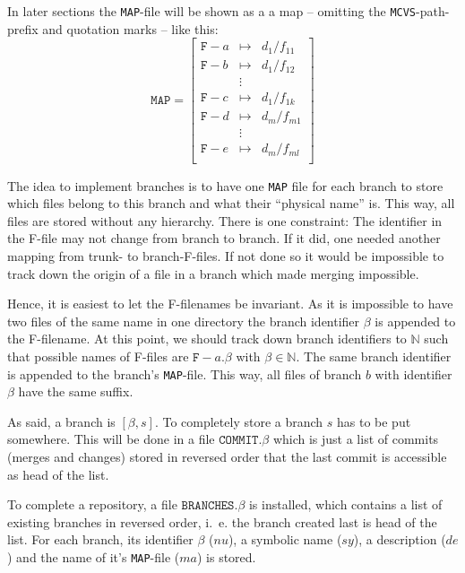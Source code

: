 \documentclass[fleqn, 10pt, a4paper]{article}
\begin{document}
In later sections the \texttt{MAP}-file will be shown as a
a map -- omitting the \texttt{MCVS}-path-prefix and quotation
marks -- like this:
\begin{displaymath}
\mathtt{MAP} =\left[
\begin{array}{lcl}
\mathtt{F-}a &\mapsto& d_1/f_{11} \\
\mathtt{F-}b &\mapsto& d_1/f_{12} \\
             &\vdots & \\
\mathtt{F-}c &\mapsto& d_1/f_{1k} \\
\mathtt{F-}d &\mapsto& d_m/f_{m1} \\
             &\vdots & \\
\mathtt{F-}e &\mapsto& d_m/f_{ml} \\
\end{array}\right]
\end{displaymath}

The idea to implement branches is to have one \texttt{MAP} file
for each branch to store which files belong to this branch and what
their ``physical name'' is. This way, all files are stored without
any hierarchy. There is one constraint: The identifier in the
F-file may not change from branch to branch. If it did, one
needed another mapping from trunk- to branch-F-files. If not done
so it would be impossible to track down the origin of a file in
a branch which made merging impossible.

Hence, it is easiest to let the F-filenames be invariant. As it is
impossible to have two files of the same name in one directory the
branch identifier $\beta$ is appended to the F-filename. At this
point, we should track down branch identifiers to $\mathbb{N}$
such that possible names of F-files are $\mathtt{F-}a\mathtt{.}\beta$
with $\beta\in \mathbb{N}$. The same branch identifier is appended
to the branch's \texttt{MAP}-file. This way, all files of
branch $b$ with identifier $\beta$ have the same suffix.

As said, a branch is $[\beta, s]$. To completely store a branch
$s$ has to be put somewhere. This will be done in a file
$\mathtt{COMMIT}.\beta$ which is just a list of commits (merges
and changes) stored in reversed order that the last commit is
accessible as head of the list.

To complete a repository, a file $\mathtt{BRANCHES.}\beta$ is installed,
which contains a list of existing branches in reversed order,
i.~e. the branch created last is head of the list.
For each branch, its identifier $\beta$ ($nu$), a symbolic name
($sy$), a description ($de$) and the name of it's
\texttt{MAP}-file ($ma$) is stored.
\end{document}
